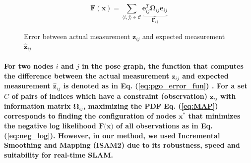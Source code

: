 \begin{equation}
\mathbf{F}(\mathbf{x}) = \sum_{\langle i, j \rangle \in \mathcal{C}} 
\underbrace{\mathbf{e}_{ij}^T \mathbf{\Omega}_{ij} \mathbf{e}_{ij}}_{\mathbf{F}_{ij}}
	\label{eq:Fx}
\end{equation}
\begin{figure}[h!]
\centering
{}
\caption{Error between actual measurement $\mathbf{z}_\textit{ij}$ and expected measurement $\hat{\mathbf{z}}_\textit{ij}$}
\end{figure}

\paragraph{\textnormal{For two nodes $\mathit{i}$ and $\mathit{j}$ in the pose graph, the function that computes the difference between the actual measurement $\mathbf{z}_\mathit{ij}$ and expected measurement $\hat{\mathbf{z}}_\mathit{ij}$ is denoted as in Eq. (\ref{eq:pgo_error_fun}) \cite{grisetti2010tutorial}. For a set $\mathit{C}$ of pairs of indices which have a constraint (observation) $\mathbf{z}_{\mathit{ij}}$  with information matrix $\mathbf{\Omega}_{\mathit{ij}}$, maximizing the PDF Eq. (\ref{eq:MAP}) corresponds to finding the configuration of nodes $\mathbf{x}^*$ that minimizes the negative log likelihood  $\textbf{F(x)}$ of all observations as in Eq. (\ref{eq:neg_log}). However, in our method, we used Incremental  Smoothing and Mapping (ISAM2\cite{5979641}) due to its robustness, speed and suitability for real-time SLAM.}}

